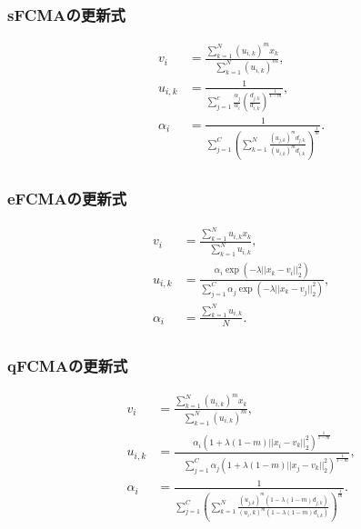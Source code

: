 \documentclass[13pt,dvipdfmx]{beamer}
\begin{document}
\begin{frame}\frametitle{sFCMAの更新式}
  \begin{eqnarray*}
    &v_{i}&=\frac{\sum_{k=1}^N(u_{i,k})^mx_{k}}{\quad\sum_{k=1}^N(u_{i,k})^{m}},\\
    &u_{i,k}&=\frac{1}{\sum_{j=1}^c\frac{\alpha_{j}}{\alpha_{i}}\left(\frac{d_{j,k}}{d_{i,k}}\right)^\frac{1}{1-m}},\\
    &\alpha_{i}&=\frac{1}{\sum_{j=1}^C\left(\sum_{k=1}^N\frac{(u_{j,k})^md_{j,k}}{(u_{i,k})^md_{i,k}}\right)^{\frac{1}{m}}}.\\
  \end{eqnarray*}
\end{frame}

\begin{frame}\frametitle{eFCMAの更新式}
  \begin{eqnarray*}
    &v_{i}& =\frac{\sum_{k=1}^Nu_{i,k}x_{k}}{\quad\sum_{k=1}^Nu_{i,k}},\\
    &u_{i,k}&=\frac{\alpha_{i}\exp(-\lambda||x_k-v_i||_2^2)}{\sum_{j=1}^C\alpha_{j}\exp(-\lambda||x_k-v_j||_2^2)},\\
    &\alpha_{i}&=\frac{\sum_{k=1}^Nu_{i,k}}{\quad N}.\\
  \end{eqnarray*}
\end{frame}

\begin{frame}\frametitle{qFCMAの更新式}
  \begin{eqnarray*}
    &v_{i}&=\frac{\sum_{k=1}^N(u_{i,k})^mx_{k}}{\quad\sum_{k=1}^N(u_{i,k})^{m}},\quad\\
    &u_{i,k}&=\frac{\alpha_{i}(1+\lambda(1-m)||x_i-v_k||_2^2)^\frac{1}{1-m}}{\quad\sum_{j=1}^C\alpha_{j}(1+\lambda(1-m)||x_j-v_k||_2^2)^\frac{1}{1-m}},\\
    & \alpha_{i}&=\frac{1}{\sum_{j=1}^C\left(\sum_{k=1}^N\frac{(u_{j,k})^m(1-\lambda(1-m)d_{j,k})}{(u_i,k)^m(1-\lambda(1-m)d_{i,k})}\right)^{\frac{1}{m}}}.\\
  \end{eqnarray*}
\end{frame}
\end{document}
